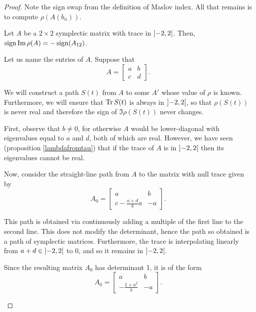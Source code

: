 \begin{proof}
Note the sign swap from the definition of Maslov index. All that remains is to compute $\rho(A(b_n))$.

\begin{lemma}
Let $A$ be a $2 \times 2$ symplectic matrix with trace in $\ointerval{-2}2$. Then, $\operatorname{sign} \operatorname{Im} \rho(A) = -\operatorname{sign}(A_{12})$.
\end{lemma}

\begin{lemmaproof}
Let us name the entries of $A$. Suppose that
\begin{equation}
A = \begin{bmatrix} a & b\\ c & d \end{bmatrix}.
\end{equation}

We will construct a path $S(t)$ from $A$ to some $A'$ whose value of $\rho$ is known. Furthermore, we will ensure that $\operatorname{Tr} S(t)$ is always in $\ointerval{-2}2$, so that $\rho(S(t))$ is never real and therefore the sign of $\Im \rho(S(t))$ never changes.

First, observe that $b \neq 0$, for otherwise $A$ would be lower-diagonal with eigenvalues equal to $a$ and $d$, both of which are real. However, we have seen (proposition \ref{lambdafromtau}) that if the trace of $A$ is in $\ointerval{-2}2$ then its eigenvalues cannot be real.

Now, consider the straight-line path from $A$ to the matrix with null trace given by
\begin{equation}
A_0 = \begin{bmatrix}
a & b\\
c-\frac{a+d}b a & -a
\end{bmatrix}.
\end{equation}

This path is obtained via continuously adding a multiple of the first line to the second line. This does not modify the determinant, hence the path so obtained is a path of symplectic matrices. Furthermore, the trace is interpolating linearly from $a+d \in \ointerval{-2}2$ to $0$, and so it remains in $\ointerval{-2}2$.

Since the resulting matrix $A_0$ has determinant 1, it is of the form
\begin{equation}
A_0 = \begin{bmatrix}
a & b\\
-\frac{1+a^2}b & -a
\end{bmatrix}.
\end{equation}


\end{lemmaproof}
\end{proof}
